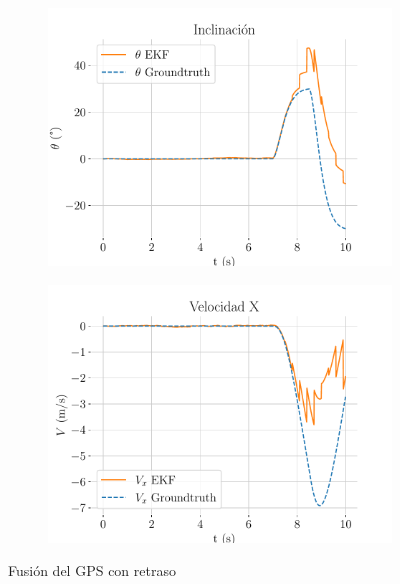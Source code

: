 \begin{figure}[b]
\begin{subfigure}[t]{0.49\textwidth}
		\centering
		\includegraphics[width=\textwidth]{estimador_px4/im_simu/no_handle_delay/theta}
		\caption{}
	\end{subfigure}
	\quad
	\begin{subfigure}[t]{0.49\textwidth}
		\centering
		\includegraphics[width=\textwidth]{estimador_px4/im_simu/no_handle_delay/vx}
		\caption{}
	\end{subfigure}
	\quad
	\caption{Fusión del GPS con retraso}
	\label{fig:no-handle}
	\vspace*{-0.5cm}
\end{figure}

